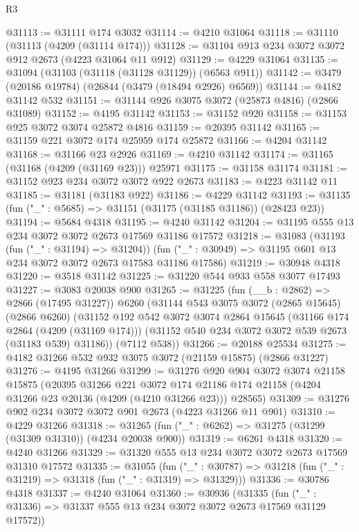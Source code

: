 \begin{lexlean}{R3}
\begin{coremodule}
@31113 := @31111 @174 @3032
@31114 := @4210 @31064
@31118 := @31110 (@31113 (@4209 (@31114 @174)))
@31128 := @31104 @913 @234 @3072 @3072 @912 @2673 (@4223 @31064 @11 @912)
@31129 := @4229 @31064
@31135 := @31094 (@31103 (@31118 (@31128 @31129)) (@6563 @911))
@31142 := @3479 (@20186 @19784) (@26844 (@3479 (@18494 @2926) @6569))
@31144 := @4182 @31142 @532
@31151 := @31144 @926 @3075 @3072 (@25873 @4816) (@2866 @31089)
@31152 := @4195 @31142
@31153 := @31152 @920
@31158 := @31153 @925 @3072 @3074 @25872 @4816
@31159 := @20395 @31142
@31165 := @31159 @221 @3072 @174 @25959 @174 @25872
@31166 := @4204 @31142
@31168 := @31166 @23 @2926
@31169 := @4210 @31142
@31174 := @31165 (@31168 (@4209 (@31169 @23))) @25971
@31175 := @31158 @31174
@31181 := @31152 @923 @234 @3072 @3072 @922 @2673
@31183 := @4223 @31142 @11
@31185 := @31181 (@31183 @922)
@31186 := @4229 @31142
@31193 := @31135 (fun ("_" : @5685) => @31151 (@31175 (@31185 @31186)) (@28423 @23))
@31194 := @5684 @4318
@31195 := @4240 @31142
@31204 := @31195 @555 @13 @234 @3072 @3072 @2673 @17569 @31186 @17572
@31218 := @31083
    (@31193 (fun ("_" : @31194) => @31204))
    (fun ("_" : @30949) => @31195 @601 @13 @234 @3072 @3072 @2673 @17583 @31186 @17586)
@31219 := @30948 @4318
@31220 := @3518 @31142
@31225 := @31220 @544 @933 @558 @3077 @17493
@31227 := @3083 @20038 @900
@31265 := @31225
    (fun (__b : @2862) => @2866 (@17495 @31227))
    @6260
    (@31144
      @543
      @3075
      @3072
      (@2865 @15645)
      (@2866 @6260)
      (@31152
        @192
        @542
        @3072
        @3074
        @2864
        @15645
        (@31166 @174 @2864 (@4209 (@31169 @174)))
        (@31152 @540 @234 @3072 @3072 @539 @2673 (@31183 @539) @31186))
      (@7112 @538))
@31266 := @20188 @25534
@31275 := @4182 @31266 @532 @932 @3075 @3072 (@21159 @15875) (@2866 @31227)
@31276 := @4195 @31266
@31299 := @31276
    @920
    @904
    @3072
    @3074
    @21158
    @15875
    (@20395
      @31266
      @221
      @3072
      @174
      @21186
      @174
      @21158
      (@4204 @31266 @23 @20136 (@4209 (@4210 @31266 @23)))
      @28565)
@31309 := @31276 @902 @234 @3072 @3072 @901 @2673 (@4223 @31266 @11 @901)
@31310 := @4229 @31266
@31318 := @31265 (fun ("_" : @6262) => @31275 (@31299 (@31309 @31310)) (@4234 @20038 @900))
@31319 := @6261 @4318
@31320 := @4240 @31266
@31329 := @31320 @555 @13 @234 @3072 @3072 @2673 @17569 @31310 @17572
@31335 := @31055
    (fun ("_" : @30787) => @31218 (fun ("_" : @31219) => @31318 (fun ("_" : @31319) => @31329)))
@31336 := @30786 @4318
@31337 := @4240 @31064
@31360 := @30936
    (@31335 (fun ("_" : @31336) => @31337 @555 @13 @234 @3072 @3072 @2673 @17569 @31129 @17572))

\end{coremodule}
\end{lexlean}
